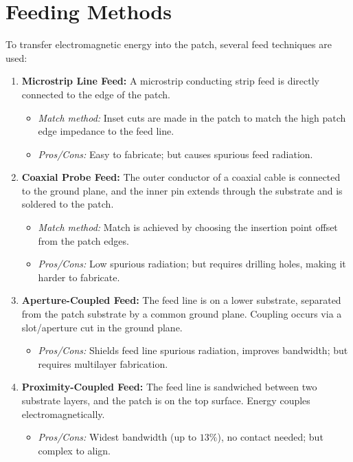 \documentclass[12pt,a4paper]{article}
\begin{document}
\section{Feeding Methods}

To transfer electromagnetic energy into the patch, several feed techniques are used:

\begin{enumerate}[label=\textbf{\arabic*.}, leftmargin=*, itemsep=4pt]
  \item \textbf{Microstrip Line Feed:} A microstrip conducting strip feed is directly connected to the edge of the patch.
    \begin{itemize}[leftmargin=*, itemsep=1pt]
      \item \textit{Match method:} Inset cuts are made in the patch to match the high patch edge impedance to the feed line.
      \item \textit{Pros/Cons:} Easy to fabricate; but causes spurious feed radiation.
    \end{itemize}
  \item \textbf{Coaxial Probe Feed:} The outer conductor of a coaxial cable is connected to the ground plane, and the inner pin extends through the substrate and is soldered to the patch.
    \begin{itemize}[leftmargin=*, itemsep=1pt]
      \item \textit{Match method:} Match is achieved by choosing the insertion point offset from the patch edges.
      \item \textit{Pros/Cons:} Low spurious radiation; but requires drilling holes, making it harder to fabricate.
    \end{itemize}
  \item \textbf{Aperture-Coupled Feed:} The feed line is on a lower substrate, separated from the patch substrate by a common ground plane. Coupling occurs via a slot/aperture cut in the ground plane.
    \begin{itemize}[leftmargin=*, itemsep=1pt]
      \item \textit{Pros/Cons:} Shields feed line spurious radiation, improves bandwidth; but requires multilayer fabrication.
    \end{itemize}
  \item \textbf{Proximity-Coupled Feed:} The feed line is sandwiched between two substrate layers, and the patch is on the top surface. Energy couples electromagnetically.
    \begin{itemize}[leftmargin=*, itemsep=1pt]
      \item \textit{Pros/Cons:} Widest bandwidth (up to $13\%$), no contact needed; but complex to align.
    \end{itemize}
\end{enumerate}
\end{document}
